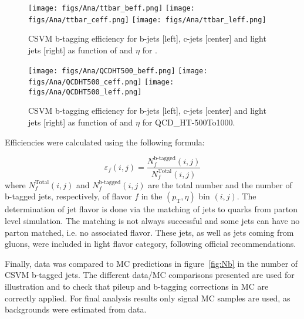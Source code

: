 \begin{figure}[!Hhtbp]
  \begin{center}
    \texttt{[image: figs/Ana/ttbar\_beff.png]}
    \texttt{[image: figs/Ana/ttbar\_ceff.png]}
    \texttt{[image: figs/Ana/ttbar\_leff.png]}
    \caption{CSVM b-tagging efficiency for b-jets [left], c-jets [center] and light jets [right] as function of \pt and $\eta$ for \ttbar.}
    \label{fig:ttbarBEff}
  \end{center}
\end{figure}

\begin{figure}[!Hhtbp]
  \begin{center}
    \texttt{[image: figs/Ana/QCDHT500\_beff.png]}
    \texttt{[image: figs/Ana/QCDHT500\_ceff.png]}
    \texttt{[image: figs/Ana/QCDHT500\_leff.png]}
    \caption{CSVM b-tagging efficiency for b-jets [left], c-jets [center] and light jets [right] as function of \pt and $\eta$ for QCD\_HT-500To1000.}
    \label{fig:QCDBEff}
  \end{center}
\end{figure}

Efficiencies were calculated using the following formula:

\begin{equation}
  \label{eq:btaggingeff}
  \varepsilon_f(i,j) = \frac{N_f^\text{b-tagged}(i,j)}{N_f^\text{Total}(i,j)}
\end{equation} where $ N_f^\text{Total}(i,j) $ and $ N_f^\text{b-tagged}(i,j) $ are the total number and the number of b-tagged jets, respectively, of flavor $ f $ in the $ (p_\text{T},\eta) $ bin $ (i,j) $. The determination of jet flavor is done via the matching of jets to quarks from parton level simulation. The matching is not always successful and some jets can have no parton matched, i.e. no associated flavor. These jets, as well as jets coming from gluons, were included in light flavor category, following official recommendations.

Finally, data was compared to MC predictions in figure~\ref{fig:Nb} in the number of CSVM b-tagged jets. The different data/MC comparisons presented are used for illustration and to check that pileup and b-tagging corrections in MC are correctly applied. For final analysis results only signal MC samples are used, as backgrounds were estimated from data.

